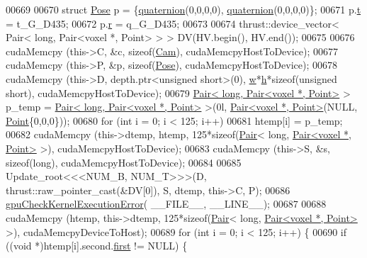\begin{DoxyCode}
{00669 
00670         \textcolor{keyword}{struct }\hyperlink{structPose}{Pose} p = \{\hyperlink{classquaternion_a01adb7930c2003b777cb91a7182c482e}{quaternion}(0,0,0,0), \hyperlink{classquaternion_a01adb7930c2003b777cb91a7182c482e}{quaternion}(0,0,0,0)\};
00671         p.\hyperlink{structPose_aa87ab4baa5bab93b316c8ef417b6f1ef}{t} = t\_G\_D435;
00672         p.\hyperlink{structPose_ac86b5844a0203b03971005be99e59388}{r} = q\_G\_D435;
00673 
00674         thrust::device\_vector< Pair< long, Pair<voxel *, Point> > > DV(HV.begin(), HV.end());
00675 
00676         cudaMemcpy (this->C, &c, \textcolor{keyword}{sizeof}(\hyperlink{structCam}{Cam}), cudaMemcpyHostToDevice);
00677         cudaMemcpy (this->P, &p, \textcolor{keyword}{sizeof}(\hyperlink{structPose}{Pose}), cudaMemcpyHostToDevice);
00678         cudaMemcpy (this->D, depth.ptr<\textcolor{keywordtype}{unsigned} \textcolor{keywordtype}{short}>(0), \hyperlink{classquaternion_ab2b38aca1971114e0ba4218b75d7f472}{w}*\hyperlink{Camera_8hpp_a3f40fea9b1040e381f08ddd4b026765d}{h}*\textcolor{keyword}{sizeof}(\textcolor{keywordtype}{unsigned} \textcolor{keywordtype}{short}), 
      cudaMemcpyHostToDevice);
00679         \hyperlink{classPair}{Pair< long, Pair<voxel *, Point>} > p\_temp = 
      \hyperlink{classPair}{Pair< long, Pair<voxel *, Point>} >(0l, 
      \hyperlink{classPair}{Pair<voxel *, Point>}(NULL, \hyperlink{structPoint}{Point}\{0,0,0\}));
00680         \textcolor{keywordflow}{for} (\textcolor{keywordtype}{int} i = 0; i < 125; i++)
00681             htemp[i] = p\_temp;
00682         cudaMemcpy (this->dtemp, htemp, 125*\textcolor{keyword}{sizeof}(\hyperlink{classPair}{Pair}< \textcolor{keywordtype}{long}, 
      \hyperlink{classPair}{Pair<voxel *, Point>} >), cudaMemcpyHostToDevice);
00683         cudaMemcpy (this->S, &s, \textcolor{keyword}{sizeof}(\textcolor{keywordtype}{long}), cudaMemcpyHostToDevice);
00684 
00685         Update\_root<<<NUM\_B, NUM\_T>>>(D, thrust::raw\_pointer\_cast(&DV[0]), S, dtemp, this->C, P);
00686         \hyperlink{Voxel_8cuh_aa881629585a7719857d28b2cbf1e1257}{gpuCheckKernelExecutionError}( \_\_FILE\_\_, \_\_LINE\_\_);
00687 
00688         cudaMemcpy (htemp, this->dtemp, 125*\textcolor{keyword}{sizeof}(\hyperlink{classPair}{Pair}< \textcolor{keywordtype}{long}, 
      \hyperlink{classPair}{Pair<voxel *, Point>} >), cudaMemcpyDeviceToHost);
00689         \textcolor{keywordflow}{for} (\textcolor{keywordtype}{int} i = 0; i < 125; i++) \{
00690             \textcolor{keywordflow}{if} ((\textcolor{keywordtype}{void} *)htemp[i].second.\hyperlink{classPair_a98924311a2986df358d3b1965f8abd06}{first} != NULL) \{
}
\end{DoxyCode}
